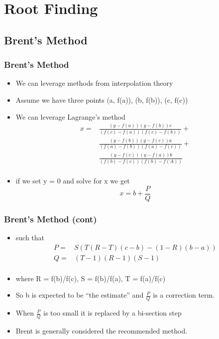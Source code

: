 \documentclass[10pt]{beamer}
\begin{document}
\section{Root Finding}

\subsection{Brent's Method}

\begin{frame}
  \frametitle{Brent's Method}
  \begin{itemize}
  \item We can leverage methods from interpolation theory
  \item Assume we have three points  (a, f(a)), (b, f(b)), (c, f(c))
  \item We can leverage Lagrange's method
    \[
      \begin{array}{cc}
      x = &  \frac{(y-f(a))(y-f(b)) c}{(f(c)-f(a))(f(c)-f(b))} +\\
          &  \frac{(y-f(b))(y-f(c)) a}{(f(a)-f(b))(f(a)-f(c))} +\\
          &  \frac{(y-f(c))(y-f(a)) b}{(f(b)-f(c))(f(b)-f(A))}\\
      \end{array}
    \]
  \item if we set y = 0 and solve for x we get
    \[
      x = b + \frac{P}{Q}
    \]
  \end{itemize}
\end{frame}

\begin{frame}
  \frametitle{Brent's Method (cont)}
  \begin{itemize}
  \item such that
    \[
      \begin{array}{cc}
        P = &  S(T(R-T)(c-b) - (1-R)(b-a))\\
        Q = & (T-1)(R-1)(S-1)\\
      \end{array}
    \]
  \item where R = f(b)/f(c), S = f(b)/f(a), T = f(a)/f(c)
  \item So b is expected to be ``the estimate'' and $\frac{P}{Q}$ is a correction term.
  \item When $\frac{P}{Q}$ is too small it is replaced by a bi-section step
  \item Brent is generally considered the recommended method. 
  \end{itemize}
\end{frame}
\end{document}
